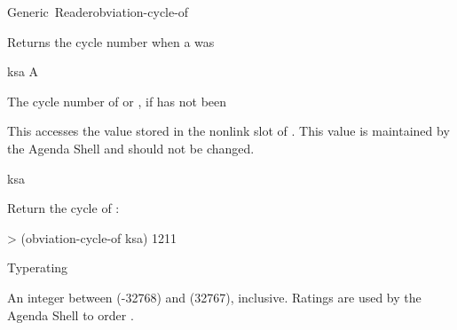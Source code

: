 \documentclass[10pt,twoside,english,pdftex]{article}
\begin{document}
\begin{functiondoc}{Generic~Reader}{obviation-cycle-of}{ 
    \returns{} }
%

\fnsyntax

\fnpurpose Returns the cycle number when a  was 

\fnmethods
{}

\fnpackage {}

\fnmodule {}

\fnargs
\begin{args}{ksa}
\arg[ksa] A 
\end{args}

\fnreturns The  cycle number of  or \nil,
if  has not been 
  
\fndescription 
This  accesses the value stored in the 
 nonlink slot of .  This value is
maintained by the Agenda Shell and should not be changed.

\begin{alsos}{ksa}
\also[ksa]
\end{alsos}

\fnexample
Return the  cycle of :
\begin{example}
> (obviation-cycle-of ksa)
1211
\end{example}

\end{functiondoc}


\begin{functiondoc}{Type}{rating}{}
%

\fnsyntax

\fnpackage {}

\fnmodule {}

\fndescription An integer between  (-32768)
and  (32767), inclusive. Ratings are used
by the Agenda Shell to order .

\end{functiondoc}

\end{document}
